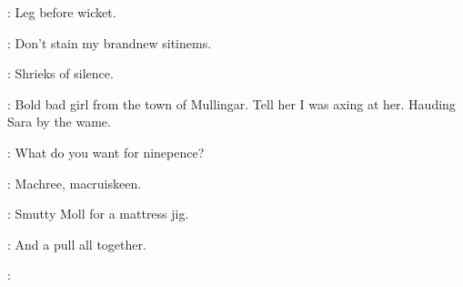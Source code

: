 \documentclass[12pt]{article}
\begin{document}
\Ly: Leg before wicket.

\Mu: Don't stain my brandnew sitinems.





: Shrieks of silence.




\Ba: Bold bad girl from the town of Mullingar.
Tell her I was axing at her.
Hauding Sara by the wame.




\Ln: What do you want for ninepence?

\SD: Machree, macruiskeen.

\Ly: Smutty Moll for a mattress jig.

\PC: And a pull all together.

\All: 

















\end{document}
